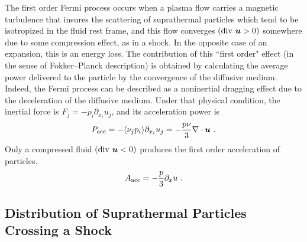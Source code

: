 \documentclass[12pt,a4paper]{article}
\renewcommand{\vec}[1]{\boldsymbol{#1}}
\begin{document}
The first order Fermi process occurs when a plasma flow carries a magnetic turbulence that insures the scattering of suprathermal particles which tend to be isotropized in the fluid rest frame, and this flow converges $({\rm div}~ \vec{u} > 0)$ somewhere due to some compression effect, as in a shock. In the opposite case of an expansion, this is an energy loss. The contribution of this ``first order" effect (in the sense of Fokker–Planck description) is obtained by calculating the average power delivered to the particle by the convergence of the diffusive medium. Indeed, the Fermi process can be described as a noninertial dragging effect due to the deceleration of the diffusive medium. Under that physical condition, the inertial force is $F_j = -p_i \partial_{x_i} u_j$, and its acceleration power is
\begin{equation}
P_{\rm acc} = -\langle \nu_j p_i \rangle \partial_{x_i} u_j = -\frac{p\nu}{3} \nabla \cdot \vec{u} ~.
\end{equation}
Only a compressed fluid $({\rm div}~ \vec{u} < 0)$ produces the first order acceleration of particles. 
\begin{equation}
A_{\rm acc} = -\frac{p}{3} \partial_x u ~.
\end{equation}




















\subsection{Distribution of Suprathermal Particles Crossing a Shock}
\end{document}
